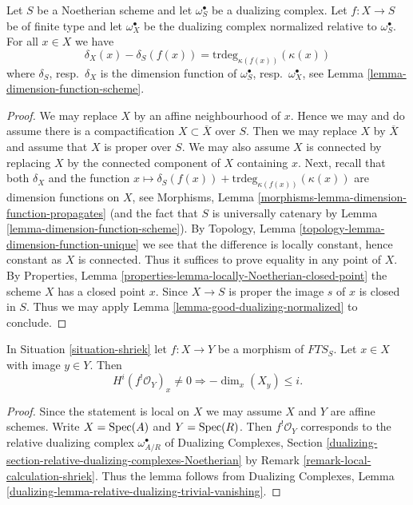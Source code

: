 \begin{lemma}
\label{lemma-good-dualizing-dimension-function}
Let $S$ be a Noetherian scheme and let $\omega_S^\bullet$ be a
dualizing complex. Let $f : X \to S$ be of finite type
and let $\omega_X^\bullet$ be the dualizing complex
normalized relative to $\omega_S^\bullet$. For all $x \in X$ we have
$$
\delta_X(x) - \delta_S(f(x)) = \text{trdeg}_{\kappa(f(x))}(\kappa(x))
$$
where $\delta_S$, resp.\ $\delta_X$
is the dimension function of
$\omega_S^\bullet$, resp.\ $\omega_X^\bullet$, see
Lemma \ref{lemma-dimension-function-scheme}.
\end{lemma}

\begin{proof}
We may replace $X$ by an affine neighbourhood of $x$. Hence we may
and do assume there is a compactification $X \subset \overline{X}$
over $S$. Then we may replace $X$ by $\overline{X}$ and assume
that $X$ is proper over $S$. We may also assume $X$ is connected
by replacing $X$ by the connected component of $X$ containing $x$.
Next, recall that both $\delta_X$ and the function
$x \mapsto \delta_S(f(x)) + \text{trdeg}_{\kappa(f(x))}(\kappa(x))$
are dimension functions on $X$, see
Morphisms, Lemma \ref{morphisms-lemma-dimension-function-propagates}
(and the fact that $S$ is universally catenary by
Lemma \ref{lemma-dimension-function-scheme}).
By Topology, Lemma \ref{topology-lemma-dimension-function-unique}
we see that the difference is locally constant, hence constant as $X$ is
connected. Thus it suffices to prove equality in any point of $X$.
By Properties, Lemma \ref{properties-lemma-locally-Noetherian-closed-point}
the scheme $X$ has a closed point $x$. Since $X \to S$ is proper
the image $s$ of $x$ is closed in $S$. Thus we may apply
Lemma \ref{lemma-good-dualizing-normalized} to conclude.
\end{proof}

\begin{lemma}
\label{lemma-shriek}
In Situation \ref{situation-shriek} let $f : X \to Y$ be a morphism of
$\textit{FTS}_S$. Let $x \in X$ with image $y \in Y$. Then
$$
H^i(f^!\mathcal{O}_Y)_x \not = 0
\Rightarrow - \dim_x(X_y) \leq i.
$$
\end{lemma}

\begin{proof}
Since the statement is local on $X$ we may assume $X$
and $Y$ are affine schemes. Write
$X = \mathop{\mathrm{Spec}}(A)$ and $Y = \mathop{\mathrm{Spec}}(R)$.
Then $f^!\mathcal{O}_Y$ corresponds to the relative dualizing
complex $\omega_{A/R}^\bullet$ of
Dualizing Complexes, Section
\ref{dualizing-section-relative-dualizing-complexes-Noetherian}
by Remark \ref{remark-local-calculation-shriek}.
Thus the lemma follows from Dualizing Complexes, Lemma
\ref{dualizing-lemma-relative-dualizing-trivial-vanishing}.
\end{proof}

